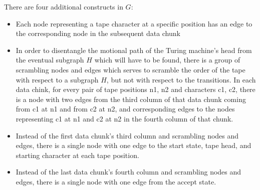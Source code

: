 \documentclass[12pt]{article}
\begin{document}
There are four additional constructs in $G$:
\begin{itemize}
	\item Each node representing a tape character at a specific position has an edge to the corresponding node in the subsequent data chunk
	\item In order to disentangle the motional path of the Turing machine’s head from the eventual subgraph $H$ which will have to be found, there is a group of scrambling nodes and edges which serves to scramble the order of the tape with respect to a subgraph $H$, but not with respect to the transitions. In each data chink, for every pair of tape positions n1, n2 and characters c1, c2, there is a node with two edges from the third column of that data chunk coming from c1 at n1 and from c2 at n2, and corresponding edges to the nodes representing c1 at n1 and c2 at n2 in the fourth column of that chunk.
	\item Instead of the first data chunk's third column and scrambling nodes and edges, there is a single node with one edge to the start state, tape head, and starting character at each tape position.
	\item Instead of the last data chunk's fourth column and scrambling nodes and edges, there is a single node with one edge from the accept state.
\end{itemize}

\vspace{25px}
\end{document}
